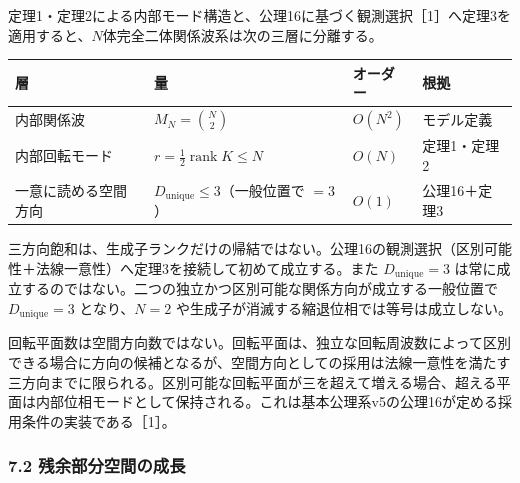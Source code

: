 \documentclass[
  a4paper,
]{ltjsarticle}
\newcounter{none} %
\begin{document}
定理1・定理2による内部モード構造と、公理16に基づく観測選択［1］へ定理3を適用すると、\(N\)体完全二体関係波系は次の三層に分離する。

{\def\LTcaptype{none} %
\begin{longtable}[]{@{}
  >{\raggedright\arraybackslash}p{}
  >{\raggedright\arraybackslash}p{}
  >{\raggedright\arraybackslash}p{}
  >{\raggedright\arraybackslash}p{}@{}}
\toprule\noalign{}
\begin{minipage}[b]{\linewidth}\raggedright
層
\end{minipage} & \begin{minipage}[b]{\linewidth}\raggedright
量
\end{minipage} & \begin{minipage}[b]{\linewidth}\raggedright
オーダー
\end{minipage} & \begin{minipage}[b]{\linewidth}\raggedright
根拠
\end{minipage} \\
\midrule\noalign{}
\endhead
\bottomrule\noalign{}
\endlastfoot
内部関係波 & \(M_N=\binom{N}{2}\) & \(O(N^2)\) & モデル定義 \\
内部回転モード & \(r=\frac12\operatorname{rank}K\le N\) & \(O(N)\) &
定理1・定理2 \\
一意に読める空間方向 & \(D_{\mathrm{unique}}\le3\)（一般位置で \(=3\)）
& \(O(1)\) & 公理16＋定理3 \\
\end{longtable}
}

三方向飽和は、生成子ランクだけの帰結ではない。公理16の観測選択（区別可能性＋法線一意性）へ定理3を接続して初めて成立する。また
\(D_{\mathrm{unique}}=3\)
は常に成立するのではない。二つの独立かつ区別可能な関係方向が成立する一般位置で
\(D_{\mathrm{unique}}=3\) となり、\(N=2\)
や生成子が消滅する縮退位相では等号は成立しない。

回転平面数は空間方向数ではない。回転平面は、独立な回転周波数によって区別できる場合に方向の候補となるが、空間方向としての採用は法線一意性を満たす三方向までに限られる。区別可能な回転平面が三を超えて増える場合、超える平面は内部位相モードとして保持される。これは基本公理系v5の公理16が定める採用条件の実装である［1］。

\subsubsection{7.2
残余部分空間の成長}\label{ux6b8bux4f59ux90e8ux5206ux7a7aux9593ux306eux6210ux9577}
\end{document}
